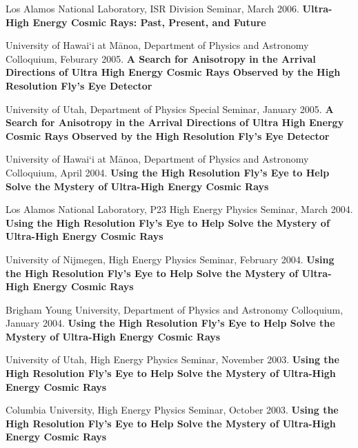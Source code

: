 \begin{resume}
Los Alamos National Laboratory, ISR Division Seminar, March 2006. 
{\bf Ultra-High Energy Cosmic Rays: Past, Present, and Future}

University of Hawai`i at M\={a}noa, 
Department of Physics and Astronomy Colloquium, 
Feburary 2005.  {\bf A Search for Anisotropy in the Arrival Directions 
of Ultra High Energy Cosmic Rays Observed by the High Resolution Fly's Eye 
Detector}

University of Utah, Department of Physics Special Seminar, January 2005.
{\bf A Search for Anisotropy in the Arrival Directions 
of Ultra High Energy Cosmic Rays Observed by the High Resolution Fly's Eye 
Detector}

University of Hawai`i at M\={a}noa, 
Department of Physics and Astronomy Colloquium, 
April 2004.  {\bf Using the High Resolution Fly's Eye to Help Solve the 
Mystery of Ultra-High Energy Cosmic Rays}

Los Alamos National Laboratory, P23 High Energy Physics Seminar, March 2004.
{\bf Using the High Resolution Fly's Eye to Help Solve the Mystery of
Ultra-High Energy Cosmic Rays}

University of Nijmegen, High Energy Physics Seminar, February 2004.
{\bf Using the High Resolution Fly's Eye to Help Solve the Mystery of
Ultra-High Energy Cosmic Rays}

Brigham Young University, Department of Physics and Astronomy Colloquium,
January 2004. {\bf Using the High Resolution Fly's Eye to Help Solve the 
Mystery of Ultra-High Energy Cosmic Rays}

University of Utah, High Energy Physics Seminar, November 2003.
{\bf Using the High Resolution Fly's Eye to Help Solve the Mystery of
Ultra-High Energy Cosmic Rays}

Columbia University, High Energy Physics Seminar, October 2003.
{\bf Using the High Resolution Fly's Eye to Help Solve the Mystery of
Ultra-High Energy Cosmic Rays}

\end{resume}



